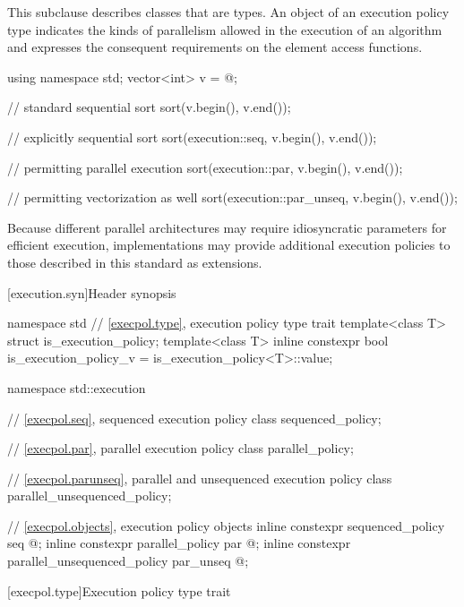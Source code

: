 \pnum
This subclause describes classes that are  types. An
object of an execution policy type indicates the kinds of parallelism allowed
in the execution of an algorithm and expresses the consequent requirements on
the element access functions.
\begin{example}
\begin{codeblock}
using namespace std;
vector<int> v = @\commentellip@;

// standard sequential sort
sort(v.begin(), v.end());

// explicitly sequential sort
sort(execution::seq, v.begin(), v.end());

// permitting parallel execution
sort(execution::par, v.begin(), v.end());

// permitting vectorization as well
sort(execution::par_unseq, v.begin(), v.end());
\end{codeblock}
\end{example}
\begin{note}
Because different parallel architectures may require idiosyncratic
parameters for efficient execution, implementations
may provide additional execution policies to those described in this
standard as extensions.
\end{note}

[execution.syn]{Header  synopsis}

%
\begin{codeblock}
namespace std {
  // \ref{execpol.type}, execution policy type trait
  template<class T> struct is_execution_policy;
  template<class T> inline constexpr bool is_execution_policy_v = is_execution_policy<T>::value;
}

namespace std::execution {
  // \ref{execpol.seq}, sequenced execution policy
  class sequenced_policy;

  // \ref{execpol.par}, parallel execution policy
  class parallel_policy;

  // \ref{execpol.parunseq}, parallel and unsequenced execution policy
  class parallel_unsequenced_policy;

  // \ref{execpol.objects}, execution policy objects
  inline constexpr sequenced_policy            seq{ @\unspec@ };
  inline constexpr parallel_policy             par{ @\unspec@ };
  inline constexpr parallel_unsequenced_policy par_unseq{ @\unspec@ };
}
\end{codeblock}

[execpol.type]{Execution policy type trait}

